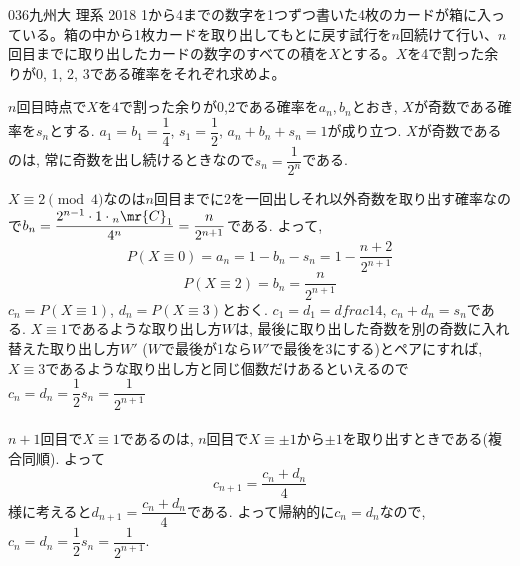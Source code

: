 \begin{thm}{036}{}{九州大 理系 2018}
 1から4までの数字を1つずつ書いた4枚のカードが箱に入っている。箱の中から1枚カードを取り出してもとに戻す試行を$n$回続けて行い、$n$回目までに取り出したカードの数字のすべての積を$X$とする。$X$を4で割った余りが0, 1, 2, 3である確率をそれぞれ求めよ。
\end{thm}

$n$回目時点で$X$を$4$で割った余りが0,2である確率を$a_n,b_n$とおき, $X$が奇数である確率を$s_n$とする. $a_1 = b_1 = \dfrac{1}{4}$, $s_1 = \dfrac{1}{2}$, $a_n+b_n+s_n = 1$が成り立つ. $X$が奇数であるのは, 常に奇数を出し続けるときなので$s_n = \dfrac{1}{2^n}$である. \par 
$X\equiv 2\pmod{4}$なのは$n$回目までに2を一回出しそれ以外奇数を取り出す確率なので$b_n = \dfrac{2^{n-1}\cdot 1\cdot {}_n\mr{C}_1}{4^n} = \dfrac{n}{2^{n+1}} $である. よって, 
\[P(X\equiv 0) = a_n = 1-b_n - s_n = 1 - \dfrac{n+2}{2^{n+1}}\]
\[P(X\equiv 2) = b_n = \dfrac{n}{2^{n+1}}\]
$c_n = P(X\equiv 1)$, $d_n = P(X\equiv 3)$とおく. $c_1=d_1 = dfrac{1}{4}$, $c_n + d_n = s_n$である. $X\equiv 1$であるような取り出し方$W$は, 最後に取り出した奇数を別の奇数に入れ替えた取り出し方$W'$ ($W$で最後が1なら$W'$で最後を3にする)とペアにすれば, $X\equiv 3$であるような取り出し方と同じ個数だけあるといえるので$c_n = d_n = \dfrac{1}{2}s_n = \dfrac{1}{2^{n+1}}$\\
\\
 $n+1$回目で$X\equiv 1$であるのは, $n$回目で$X\equiv \pm 1$から$\pm 1$を取り出すときである(複合同順). よって
\[c_{n+1} = \dfrac{c_n+d_n}{4}\]
様に考えると$d_{n+1} = \dfrac{c_n+d_n}{4}$である. よって帰納的に$c_n  = d_n$なので, $c_n = d_n = \dfrac{1}{2}s_n = \dfrac{1}{2^{n+1}}$. 
